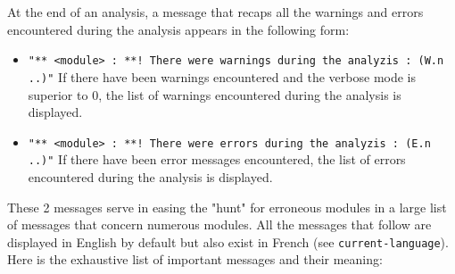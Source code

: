 At the end of an analysis, a message that recaps all the warnings and errors encountered during the analysis appears in the following form:  
\begin{itemize}
\item {\tt "** <module> : **! There were warnings during the analyzis : (W.n ..)"}
If there have been warnings encountered and the verbose mode is superior to 0, the list of warnings encountered during the analysis is displayed.
\item {\tt "** <module> : **! There were errors during the analyzis : (E.n ..)"}
If there have been error messages encountered, the list of errors encountered during the analysis is displayed. 
\end{itemize}
These 2 messages serve in easing the "hunt" for erroneous modules in a large list of messages that concern numerous modules.
All the messages that follow are displayed in English by default but also exist in French (see {\tt current-language}).  Here is the exhaustive list of important messages and their meaning:
